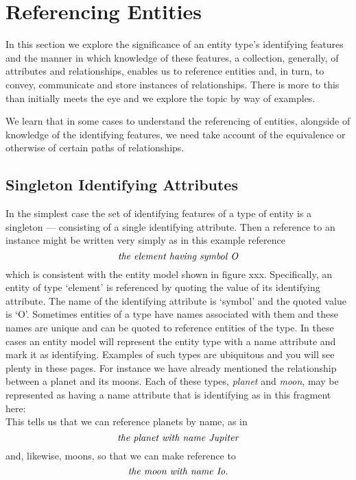\section{Referencing Entities}
\label{ReferencingEntities}

In this section we explore the significance of an entity type's identifying features
and the manner in which knowledge of these features, 
a collection, generally, of attributes and relationships, enables us to 
reference entities and, in turn, 
to convey, communicate and store instances of relationships. 
There is more to this than initially meets the eye and we explore the topic
by way of examples.   
\begin{newtt}
We learn that in some cases to understand the referencing of entities, alongside of knowledge of the identifying features, we need take account of the equivalence or otherwise of certain paths of relationships.
\end{newtt}
\subsection{Singleton Identifying Attributes}
\mynote
In the simplest case the set of identifying features of a type of entity is a singleton --- consisting of a single identifying attribute. Then a reference to an instance might be written very simply as in this example reference
\begin{equation}
\label{theElementOxygen}
\mbox{\textit{the element having symbol O}}
\end{equation}
which is consistent with the entity model shown in figure xxx.
Specifically, an entity of type `element' is referenced by quoting the value of its identifying attribute. The name of the identifying attribute is
`symbol' and the quoted value is `O'.
\mynote
Sometimes entities of a type have names associated with them
 and these names are unique and can be  quoted to reference entities of the type. 
 In these cases an entity model will represent the entity type with a name attribute
and mark it as identifying. 
Examples of such types are ubiquitous and you will see plenty in these pages.
For instance we have already mentioned the relationship between
a planet and its moons.
Each of these types, \textit{planet} and  \textit{moon}, may be represented as having 
a name attribute that is identifying as in this fragment here:
\begin{equation}
\label{planetMoonModel}

\end{equation}
This tells us that we can reference planets by name, as in 
\begin{equation}
\label{theplanetJupiter}
\mbox{\textit{the planet with name Jupiter}}
\end{equation}
and, likewise, moons, so that we can make reference to 
\begin{equation}
\label{themoonIo}
\mbox{\textit{the moon with name Io}}.
\end{equation}

